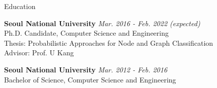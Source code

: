 \documentclass{resume} %
\begin{document}

\begin{rSection}{Education}

\textbf{Seoul National University} \hfill \emph{Mar. 2016 - Feb. 2022 (expected)} \\ 
Ph.D. Candidate, Computer Science and Engineering \\
Thesis: Probabilistic Approaches for Node and Graph Classification \\
Advisor: Prof. U Kang

\textbf{Seoul National University} \hfill \emph{Mar. 2012 - Feb. 2016} \\ 
Bachelor of Science, Computer Science and Engineering

\end{rSection}

\end{document}
